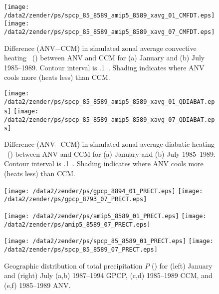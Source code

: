 \documentclass[twocolumn,final]{article}
\begin{document}
\begin{figure}
\begin{center}
\texttt{[image: /data2/zender/ps/spcp\_85\_8589\_amip5\_8589\_xavg\_01\_CMFDT.eps]}\vfill
\texttt{[image: /data2/zender/ps/spcp\_85\_8589\_amip5\_8589\_xavg\_07\_CMFDT.eps]}\vfill
\end{center}
\caption[Difference (ANV$-$CCM) in simulated zonal average convective
heating \QC\ between ANV and CCM for January and July 1985--1989]{
Difference (ANV$-$CCM) in simulated zonal average convective heating
\QC\ (\kxday) between ANV and CCM for (a) January and (b) July
1985--1989. 
Contour interval is .1~\kxday. 
Shading indicates where ANV cools more (heats less) than CCM. 
\label{fig:xavg_8589_CMFDT}}   
\end{figure}

\begin{figure}
\begin{center}
\texttt{[image: /data2/zender/ps/spcp\_85\_8589\_amip5\_8589\_xavg\_01\_QDIABAT.eps]}\vfill
\texttt{[image: /data2/zender/ps/spcp\_85\_8589\_amip5\_8589\_xavg\_07\_QDIABAT.eps]}\vfill
\end{center}
\caption[Difference (ANV$-$CCM) in simulated zonal average diabatic
heating \QT\ between ANV and CCM for January and July 1985--1989]{
Difference (ANV$-$CCM) in simulated zonal average diabatic heating
\QT\ (\kxday) between ANV and CCM for (a) January and (b) July
1985--1989. 
Contour interval is .1~\kxday. 
Shading indicates where ANV cools more (heats less) than CCM. 
\label{fig:xavg_8589_QDIABAT}}   
\end{figure}
\clearpage

\begin{figure*}
\begin{center}
\texttt{[image: /data2/zender/ps/gpcp\_8894\_01\_PRECT.eps]}%
\texttt{[image: /data2/zender/ps/gpcp\_8793\_07\_PRECT.eps]}%

\texttt{[image: /data2/zender/ps/amip5\_8589\_01\_PRECT.eps]}%
\texttt{[image: /data2/zender/ps/amip5\_8589\_07\_PRECT.eps]}%

\texttt{[image: /data2/zender/ps/spcp\_85\_8589\_01\_PRECT.eps]}%
\texttt{[image: /data2/zender/ps/spcp\_85\_8589\_07\_PRECT.eps]}%
\end{center}
\caption[Geographic distribution of total precipitation $P$ 
for January and July GPCP, CCM, and ANV]{ 
Geographic distribution of total precipitation $P$ (\mmxday)
for (left) January and (right) July (a,b) 1987--1994 GPCP, (c,d)
1985--1989 CCM, and (e,f) 1985--1989 ANV.   
\label{fig:8589_PRECT}}   
\end{figure*}
\clearpage
\end{document}
